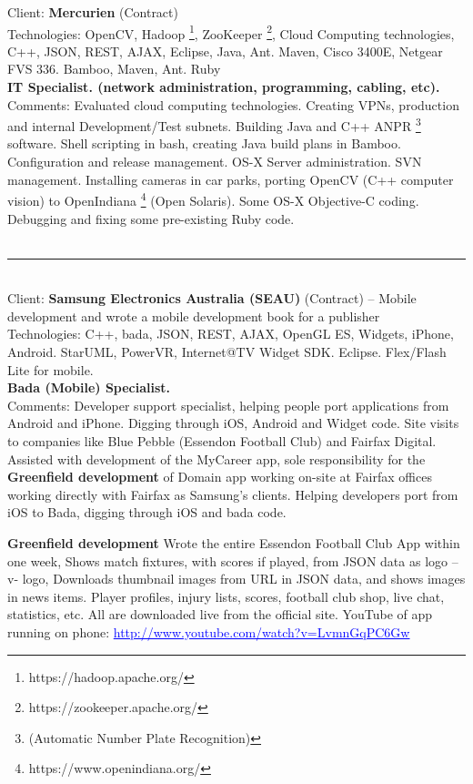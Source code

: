\documentclass{article}
\let\svthefootnote\thefootnote
\newcommand\Cfootnote[2][black]{\def\thefootnote{\color{#1}\svthefootnote}%
  \footnote{\color{#1}#2}}
\begin{document}
Client: 	\textbf  {Mercurien } (Contract) \\
Technologies: 	OpenCV, Hadoop\Cfootnote[blue]{https://hadoop.apache.org/}, ZooKeeper\Cfootnote[blue]{https://zookeeper.apache.org/}, Cloud Computing technologies, C++, JSON, REST, AJAX, Eclipse, Java, Ant. Maven, Cisco 3400E, Netgear FVS 336.  Bamboo, Maven, Ant. Ruby \\
\textbf{ IT Specialist. (network administration, programming, cabling, etc). } \\
Comments:	Evaluated cloud computing technologies. Creating VPNs, production 
		and internal Development/Test subnets. Building Java and C++ 
ANPR \footnote{(Automatic Number Plate Recognition)} software. Shell scripting in bash, creating Java build plans in Bamboo. Configuration and release management. OS-X Server administration. SVN management.  Installing cameras in car parks, porting OpenCV (C++ computer vision) to OpenIndiana\Cfootnote[blue]{https://www.openindiana.org/} (Open Solaris). Some OS-X Objective-C coding. Debugging and fixing some pre-existing Ruby code. \\
\\

\noindent\hfil\rule{0.5\textwidth}{.4pt}\hfil
\\



Client: 	\textbf  {Samsung Electronics Australia (SEAU)}  (Contract)  -- Mobile development and wrote a mobile development book for a publisher  \\
Technologies: 	C++, bada, JSON, REST, AJAX, OpenGL ES, Widgets, iPhone, Android. StarUML, PowerVR, Internet@TV Widget SDK. Eclipse. Flex/Flash Lite for mobile. \\
\textbf{  Bada (Mobile) Specialist. } \\
Comments:	Developer support specialist, helping people port applications from Android and iPhone. Digging through iOS, Android and Widget code. Site visits to companies like Blue Pebble (Essendon Football Club) and Fairfax Digital. Assisted with development of the MyCareer app, sole responsibility for the {\bf Greenfield development} of Domain app working on-site at Fairfax offices working directly with Fairfax as Samsung’s clients. Helping developers port from iOS to Bada, digging through iOS and bada code.  

	{\bf Greenfield development} Wrote the entire Essendon Football Club App within one week, Shows match fixtures, with scores if played, from JSON data as logo –v- logo, Downloads thumbnail images from URL in JSON data, and shows images in news items. Player profiles, injury lists, scores, football club shop, live chat, statistics, etc. All are downloaded live from the official site. YouTube of app running on phone: \textcolor{blue}{ \underline{http://www.youtube.com/watch?v=LvmnGqPC6Gw}}\\
\end{document}
